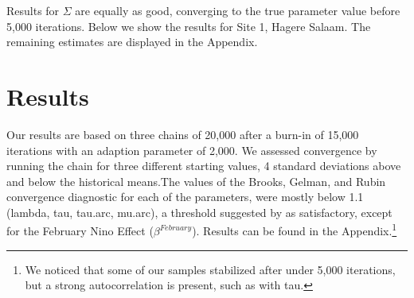 \documentclass[12pt]{article}
\begin{document}





Results for $\Sigma$ are equally as good, converging to the true parameter value before 5,000 iterations. Below we show the results for Site 1, Hagere Salaam. The remaining estimates are displayed in the Appendix. 




\section{Results}
\label{sec:results}
Our results are based on three chains of 20,000 after a burn-in of 15,000 iterations with an adaption parameter of 2,000. We assessed convergence by running the chain for three different starting values, 4 standard deviations above and below the historical means.The values of the Brooks, Gelman, and Rubin convergence diagnostic for each of the parameters, were mostly below 1.1 (lambda, tau, tau.arc, mu.arc), a threshold suggested by \citet{Gamerman1997} as satisfactory, except for the February Nino Effect ($\beta^{February}$). Results can be found in the Appendix.\footnote{We noticed that some of our samples stabilized after under 5,000 iterations, but a strong autocorrelation is present, such as with tau.}  
\end{document}
